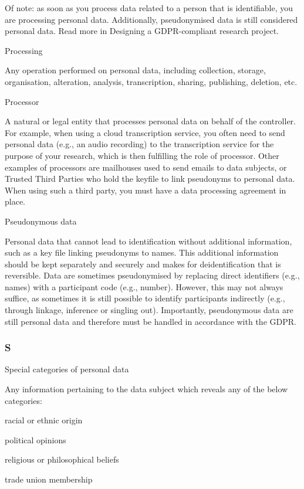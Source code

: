 \documentclass[
]{book}
\begin{document}
Of note: as soon as you process data related to a person that is identifiable, you are processing personal data. Additionally,
pseudonymised data is still considered personal data. Read more in Designing a GDPR-compliant research project.

Processing

Any operation performed on personal data, including collection, storage, organisation, alteration, analysis,
transcription, sharing, publishing, deletion, etc.

Processor

A natural or legal entity that processes personal data on behalf of the
controller. For example, when using a cloud transcription service, you often
need to send personal data (e.g., an audio recording) to the transcription
service for the purpose of your research, which is then fulfilling the role
of processor. Other examples of processors are mailhouses used to send emails
to data subjects, or Trusted Third Parties who hold the keyfile to link
pseudonyms to personal data. When using such a third party, you must have a
data processing agreement in place.

Pseudonymous data

Personal data that cannot lead to identification without additional information,
such as a key file linking pseudonyms to names. This additional information should be kept separately and securely
and makes for deidentification that is reversible. Data are sometimes pseudonymised by replacing direct identifiers
(e.g., names) with a participant code (e.g., number). However, this may not always suffice, as sometimes it is still
possible to identify participants indirectly (e.g., through linkage, inference or singling out). Importantly, pseudonymous
data are still personal data and therefore must be handled in accordance with the GDPR.

\hypertarget{s}{%
\subsubsection{S}\label{s}}

Special categories of personal data

Any information pertaining to the data subject which reveals any of the below categories:

racial or ethnic origin

political opinions

religious or philosophical beliefs

trade union membership
\end{document}
